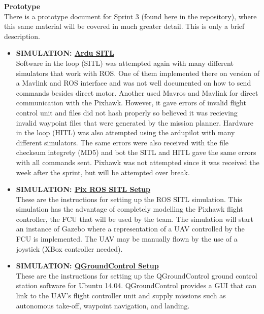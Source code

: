 \vspace{6mm}
\noindent\Large{\textbf{Prototype}}\\
\normalsize
There is a prototype document for Sprint 3 (found \href{https://github.com/SDSMT-CSC464-F15/landingpad/tree/master/Documents/Prototypes/Sprint_3}{here} in the repository), where this same material will be covered in much greater detail. This is only a brief description.
\begin{itemize}
\item \textbf{SIMULATION: \href{https://github.com/SDSMT-CSC464-F15/landingpad/blob/master/Documents/Prototypes/Sprint_3/ardusitl.pdf}{Ardu SITL}}\\
Software in the loop (SITL) was attempted again with many different simulators that work with ROS. One of them implemented there on version of a Mavlink and ROS interface and was not well documented on how to send commands besides direct motor. Another used Mavros and Mavlink for direct communication with the Pixhawk. However, it gave errors of invalid flight control unit and files did not hash properly so believed it was recieving invalid waypoint files that were generated by the mission planner. Hardware in the loop (HITL) was also attempted using the ardupilot with many different simulators. The same errors were also received with the file checksum integrety (MD5) and bot the SITL and HITL gave the same errors with all commands sent. Pixhawk was not attempted since it was received the week after the sprint, but will be attempted over break.
\item \textbf{SIMULATION: \href{https://github.com/SDSMT-CSC464-F15/landingpad/blob/master/Documents/Prototypes/Sprint_3/rossitl.pdf}{Pix ROS SITL Setup}}\\
These are the instructions for setting up the ROS SITL simulation. This simulation has the advantage of completely modelling the Pixhawk flight controller, the FCU that will be used by the team. The simulation will start an instance of Gazebo where a representation of a UAV controlled by the FCU is implemented. The UAV may be manually flown by the use of a joystick (XBox controller needed). 
\item \textbf{SIMULATION: \href{https://github.com/SDSMT-CSC464-F15/landingpad/blob/master/Documents/Prototypes/Sprint_3/gcsinstall.pdf}{QGroundControl Setup}} \\
These are the instructions for setting up the QGroundControl ground control station software for Ubuntu 14.04. QGroundControl provides a GUI that can link to the UAV's flight controller unit and supply missions such as autonomous take-off, waypoint navigation, and landing.  

\end{itemize}
